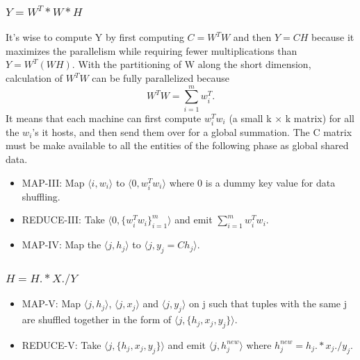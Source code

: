 \documentclass[a4paper,12pt]{article}
\begin{document}
     \subsubsection{$ Y = W^T * W * H $}
       It's wise to compute Y by first computing $C= W^T W$ and then
       $Y=CH$ because it maximizes the parallelism while requiring
       fewer multiplications than $Y= W^T (W H)$. With the partitioning
       of W along the short dimension, calculation of $ W^T W $ can be
       fully parallelized because $$ W^T W = \sum_{i=1}^{m} w_i^T. $$
       It means that each machine can first compute $w_i^T w_i$  (a
       small k × k matrix) for all the $w_i$’s it hosts, and then send
       them over for a global summation. The C matrix must be make
       available to all the entities of the following phase as global
       shared data.

       \begin{itemize}

         \item MAP-III: Map $\langle i, w_i \rangle$ to  $\langle 0,
           w_i^T w_i \rangle$ where 0 is a dummy key value for data
           shuffling.

          \item REDUCE-III: Take $\langle 0,
           \{w_i^T w_i\}_{i=1}^{m} \rangle $ and emit $\sum_{i=1}^{m} w_i^T w_i$.

         \item MAP-IV: Map the $ \langle j, h_j \rangle$ to $ \langle
           j, y_j = Ch_j \rangle$.

       \end{itemize}


     \subsubsection{$ H = H .* X ./ Y $}
       \begin{itemize}

       \item MAP-V: Map $\langle j, h_j \rangle$, $\langle j, x_j
           \rangle$ and $\langle j, y_j \rangle$ on j such that tuples
           with the same j are shuffled together in the form of
           $\langle j, \{h_j, x_j, y_j\} \rangle$.

         \item REDUCE-V: Take $\langle j, \{h_j, x_j, y_j\} \rangle$
            and emit $\langle j, h_j^{new} \rangle$ where $h_j^{new} =
            h_j .* x_j ./ y_j $.

          \end{itemize}
\end{document}
